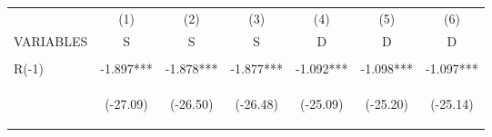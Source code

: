 \documentclass[]{article}
\begin{document}
\begin{center}
    \begin{tabular}{lcccccc} \hline
                         & (1)                                            & (2)                                            & (3)                                            & (4)                                             & (5)                                            & (6)                                            \\
        VARIABLES        & S                                              & S                                              & S                                              & D                                               & D                                              & D                                              \\ \hline
        \vspace{4pt}     & \begin{footnotesize}\end{footnotesize}         & \begin{footnotesize}\end{footnotesize}         & \begin{footnotesize}\end{footnotesize}         & \begin{footnotesize}\end{footnotesize}          & \begin{footnotesize}\end{footnotesize}         & \begin{footnotesize}\end{footnotesize}         \\
        R(-1)            & -1.897***                                      & -1.878***                                      & -1.877***                                      & -1.092***                                       & -1.098***                                      & -1.097***                                      \\
        \vspace{4pt}     & \begin{footnotesize}(-27.09)\end{footnotesize} & \begin{footnotesize}(-26.50)\end{footnotesize} & \begin{footnotesize}(-26.48)\end{footnotesize} & \begin{footnotesize}(-25.09)\end{footnotesize}  & \begin{footnotesize}(-25.20)\end{footnotesize} & \begin{footnotesize}(-25.14)\end{footnotesize} \\

\end{tabular}
\end{center}
\end{document}
